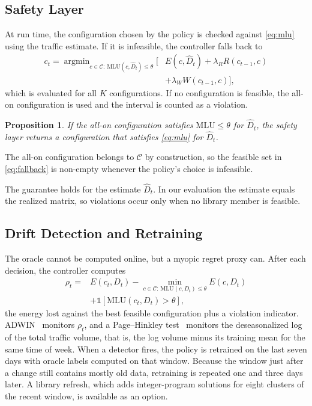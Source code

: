 \documentclass[journal]{IEEEtran}
\newtheorem{proposition}{Proposition}
\begin{document}
\subsection{Safety Layer}

At run time, the configuration chosen by the policy is checked against \eqref{eq:mlu} using the traffic estimate. If it is infeasible, the controller falls back to
\begin{equation}\label{eq:fallback}
\begin{split}c_t=\mathop{\arg\min}_{c\in\mathcal{C}:\,\mathrm{MLU}(c,\hat D_t)\le\theta}\Big[&E(c,\hat D_t)+\lambda_R R(c_{t-1},c)\\
&+\lambda_W W(c_{t-1},c)\Big],\end{split}
\end{equation}
which is evaluated for all $K$ configurations. If no configuration is feasible, the all-on configuration is used and the interval is counted as a violation.
\begin{proposition}\label{prop:safety}
If the all-on configuration satisfies $\mathrm{MLU}\le\theta$ for $\hat D_t$, the safety layer returns a configuration that satisfies \eqref{eq:mlu} for $\hat D_t$.
\end{proposition}
\begin{IEEEproof}
The all-on configuration belongs to $\mathcal{C}$ by construction, so the feasible set in \eqref{eq:fallback} is non-empty whenever the policy's choice is infeasible.
\end{IEEEproof}
The guarantee holds for the estimate $\hat D_t$. In our evaluation the estimate equals the realized matrix, so violations occur only when no library member is feasible.

\subsection{Drift Detection and Retraining}\label{sec:drift}

The oracle cannot be computed online, but a myopic regret proxy can. After each decision, the controller computes
\begin{equation}\label{eq:proxy}
\begin{split}\rho_t=&E(c_t,D_t)-\min_{c\in\mathcal{C}:\,\mathrm{MLU}(c,D_t)\le\theta}E(c,D_t)\\
&+\mathbb{1}[\mathrm{MLU}(c_t,D_t)>\theta],\end{split}
\end{equation}
the energy lost against the best feasible configuration plus a violation indicator. ADWIN~\cite{bifet2007adwin} monitors $\rho_t$, and a Page--Hinkley test~\cite{page1954cusum} monitors the deseasonalized log of the total traffic volume, that is, the log volume minus its training mean for the same time of week. When a detector fires, the policy is retrained on the last seven days with oracle labels computed on that window. Because the window just after a change still contains mostly old data, retraining is repeated one and three days later. A library refresh, which adds integer-program solutions for eight clusters of the recent window, is available as an option.
\end{document}
